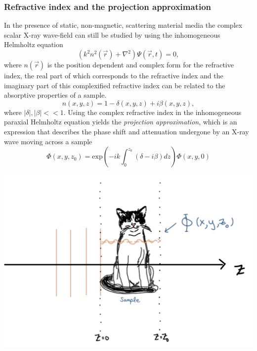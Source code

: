 \documentclass[9pt, a4paper]{article}
\newenvironment{Figure}
    {\par\medskip\noindent\minipage{\linewidth}}
    {\endminipage\par\medskip}
\begin{document}
\subsubsection{Refractive index and the projection approximation}
In the presence of static, non-magnetic, scattering material media the complex scalar X-ray wave-field can still be studied by using the inhomogeneous Helmholtz equation 
\begin{equation}\label{eq:10}
\left ( k^2 n^2 (\vec{r}) + \nabla^{2}  \right )\Psi(\vec{r},t) = 0,
\end{equation}
where $n(\vec{r})$ is the position dependent and complex form for the refractive index, the real part of which corresponds to the refractive index and the imaginary part of this complexified refractive index can be related to the absorptive properties of a sample\cite{PagsTutes}.
\begin{equation}\label{eq:11}
n(x, y, z) = 1 - \delta(x, y, z) + i \beta(x, y, z),
\end{equation}
where $|\delta|, |\beta| << 1$. Using the complex refractive index in the inhomogeneous paraxial Helmholtz equation yields the \textit{projection approximation}, which is an expression that describes the phase shift and attenuation undergone by an X-ray wave moving across a sample
\begin{equation}\label{eq:12}
\Phi(x, y, z_0) = \mathrm{exp} \left ( -ik \int_{0}^{z_0}(\delta - i\beta)dz\right ) \Phi(x, y, 0)
\end{equation}
\begin{Figure}
\centering
\includegraphics[width=0.6\linewidth]{projection_approximation.pdf}
\end{Figure}
\end{document}
